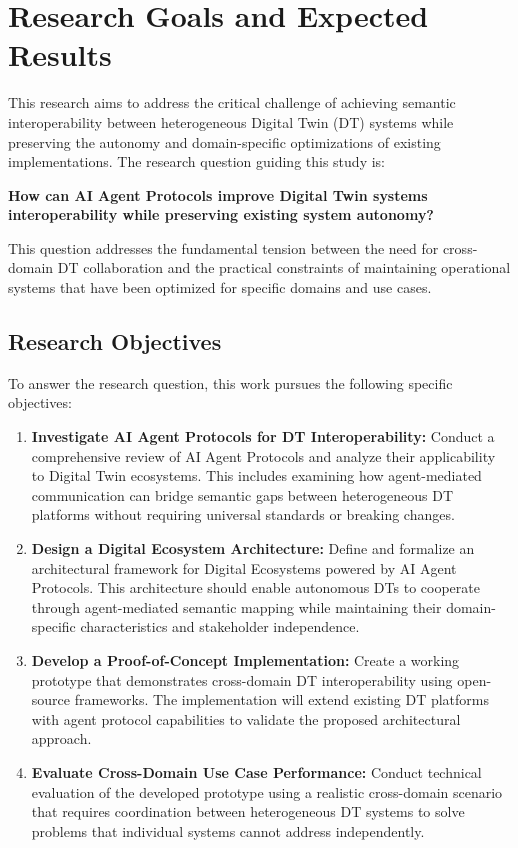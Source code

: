 \chapter{Research Goals and Expected Results}
\label{chap:objectives}

This research aims to address the critical challenge of achieving semantic interoperability between heterogeneous Digital Twin (DT) systems while preserving the autonomy and domain-specific optimizations of existing implementations.
The research question guiding this study is:

\textbf{How can AI Agent Protocols improve Digital Twin systems interoperability while preserving existing system autonomy?}

This question addresses the fundamental tension between the need for cross-domain DT collaboration and the practical constraints of maintaining operational systems that have been optimized for specific domains and use cases.

\section{Research Objectives}
\label{sec:objectives}

To answer the research question, this work pursues the following specific objectives:

\begin{enumerate}
    \item \textbf{Investigate AI Agent Protocols for DT Interoperability:} 
    Conduct a comprehensive review of AI Agent Protocols and analyze their applicability to Digital Twin ecosystems.
    This includes examining how agent-mediated communication can bridge semantic gaps between heterogeneous DT platforms
      without requiring universal standards or breaking changes.

    \item \textbf{Design a Digital Ecosystem Architecture:}
    Define and formalize an architectural framework for Digital Ecosystems powered by AI Agent Protocols.
      This architecture should enable autonomous DTs to cooperate through agent-mediated semantic mapping
        while maintaining their domain-specific characteristics and stakeholder independence.

    \item \textbf{Develop a Proof-of-Concept Implementation:}
    Create a working prototype that demonstrates cross-domain DT interoperability using open-source frameworks.
      The implementation will extend existing DT platforms with agent protocol capabilities to validate the proposed architectural approach.

    \item \textbf{Evaluate Cross-Domain Use Case Performance:}
    Conduct technical evaluation of the developed prototype using a realistic cross-domain scenario
      that requires coordination between heterogeneous DT systems to solve problems that individual systems cannot address independently.
\end{enumerate}


